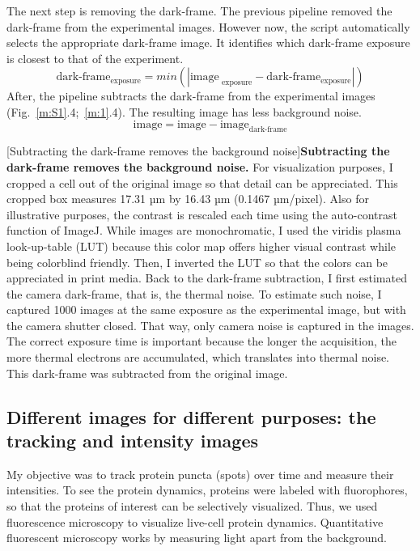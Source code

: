 The next step is removing the dark-frame. The previous pipeline removed the dark-frame from the experimental images. However now, the script automatically selects the appropriate dark-frame image. It identifies which dark-frame exposure is closest to that of the experiment. \begin{equation*}\text{dark-frame}_{\text{exposure}} = min(|\text{image}_\text{ exposure} - \text{dark-frame}_{\text{exposure}}|)\end{equation*} After, the pipeline subtracts the dark-frame from the experimental images (Fig.~\ref{m:S1}.4;~\ref{m:1}.4). The resulting image has less background noise. \begin{equation*}\text{image} = \text{image} - \text{image}_\text{dark-frame}\end{equation*}

\begin{centering}
\captionsetup{parbox=none}
[Subtracting the dark-frame removes the background noise]{\textbf{Subtracting the dark-frame removes the background noise.} For visualization purposes, I cropped a cell out of the original image so that detail can be appreciated. This cropped box measures 17.31 µm by 16.43 µm (0.1467 µm/pixel). Also for illustrative purposes, the contrast is rescaled each time using the auto-contrast function of ImageJ. While images are monochromatic, I used the viridis plasma look-up-table (LUT) because this color map offers higher visual contrast while being colorblind friendly. Then, I inverted the LUT so that the colors can be appreciated in print media. Back to the dark-frame subtraction, I first estimated the camera dark-frame, that is, the thermal noise. To estimate such noise, I captured 1000 images at the same exposure as the experimental image, but with the camera shutter closed. That way, only camera noise is captured in the images. The correct exposure time is important because the longer the acquisition, the more thermal electrons are accumulated, which translates into thermal noise. This dark-frame was subtracted from the original image.}
\label{m:S1}
\end{centering}

\subsection{Different images for different purposes: the tracking and intensity images}
My objective was to track protein puncta (spots) over time and measure their intensities. To see the protein dynamics, proteins were labeled with fluorophores, so that the proteins of interest can be selectively visualized. Thus, we used fluorescence microscopy to visualize live-cell protein dynamics. Quantitative fluorescent microscopy works by measuring light apart from the background.

